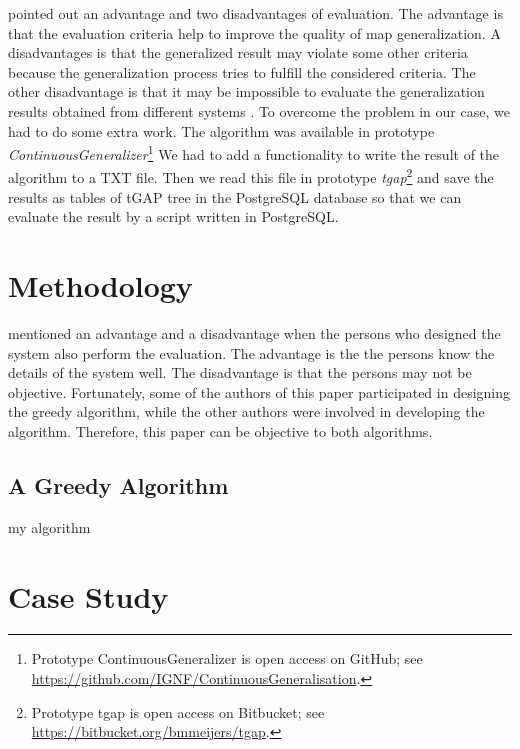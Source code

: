 \documentclass[ijgi,article,submit,moreauthors,pdftex]{Definitions/mdpi}
\begin{document}
\citet{Stoter2014Evaluation} pointed out 
an advantage and two disadvantages of evaluation.
The advantage is that 
the evaluation criteria help to improve the quality of map generalization.
A disadvantages is that 
the generalized result may violate some other criteria 
because the generalization process tries to fulfill the considered criteria.
The other disadvantage is that it may be impossible to evaluate 
the generalization results 
obtained from different systems \citep{Ruas2001Report}.
To overcome the problem in our case, 
we had to do some extra work.
The \astar algorithm was available in prototype
\emph{ContinuousGeneralizer}\footnote{Prototype ContinuousGeneralizer
    is open access on GitHub; 
	see	\url{https://github.com/IGNF/ContinuousGeneralisation}.}
We had to add a functionality 
to write the result of the \astar algorithm to a TXT file.
Then we read this file in prototype 
\emph{tgap}\footnote{Prototype tgap is open access on Bitbucket; 
	see	\url{https://bitbucket.org/bmmeijers/tgap}.}
and save the results as tables of tGAP tree in the PostgreSQL database
so that we can evaluate the result by a script written in 
PostgreSQL.






\cite{Ruas2001Report}

\section{Methodology}
\label{sec:methodology}

\citet{Ruas2001Report} mentioned an advantage and a disadvantage
when the persons who designed the system also perform the evaluation.
The advantage is the the persons know the details of the system well.
The disadvantage is that the persons may not be objective.
Fortunately, some of the authors of this paper 
participated in designing the greedy algorithm,
while the other authors were involved in developing the \astar algorithm.
Therefore, this paper can be objective to both algorithms.




\subsection{A Greedy Algorithm}
\label{sec:greedy_algo}


my algorithm



\section{Case Study}
\label{sec:case_study}
\end{document}
